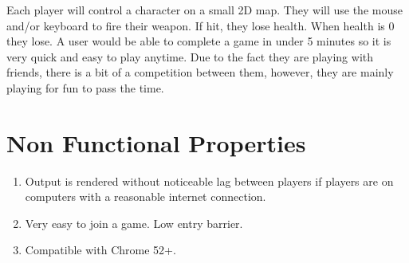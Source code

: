 \documentclass[11pt, oneside]{article}   	%
\begin{document}
Each player will control a character on a small 2D map. They will use the mouse and/or keyboard to fire their weapon. If hit, they lose health. When health is 0 they lose. A user would be able to complete a game in under 5 minutes so it is very quick and easy to play anytime. Due to the fact they are playing with friends, there is a bit of a competition between them, however, they are mainly playing for fun to pass the time.  \\



\section{Non Functional Properties} 
\begin{enumerate}
\item Output is rendered without noticeable lag between players if players are on computers with a reasonable internet connection. 
\item Very easy to join a game. Low entry barrier. 
\item Compatible with Chrome 52+.
\end{enumerate}
\end{document}
